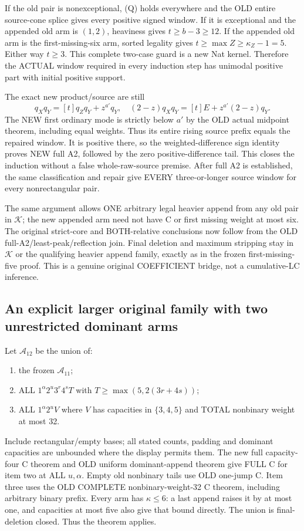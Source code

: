 If the old pair is nonexceptional, (Q) holds everywhere and the
OLD entire source-cone splice gives every positive signed window.
If it is exceptional and the appended old arm is $(1,2)$,
heaviness gives $t\ge b-3\ge12$. If the appended old arm is
the first-missing-six arm, sorted legality gives
$t\ge\max Z\ge\kappa_Z-1=5$. Either way $t\ge3$.
This complete two-case guard is a new Nat kernel.
Therefore the ACTUAL window required in every induction step
has unimodal positive part with initial positive support.

The exact new product/source are still
\[
 q_Xq_Y=[t]q_Zq_Y+z^{a'}q_Y,\quad
 (2-z)q_Xq_Y=[t]E+z^{a'}(2-z)q_Y.
\]
The NEW first ordinary mode is strictly below $a'$ by the OLD
actual midpoint theorem, including equal weights. Thus its
entire rising source prefix equals the repaired window. It is
positive there, so the weighted-difference sign identity proves
NEW full A2, followed by the zero positive-difference tail.
This closes the induction without a false whole-raw-source premise.
After full A2 is established, the same classification and repair
give EVERY three-or-longer source window for every nonrectangular pair.

The same argument allows ONE arbitrary legal heavier append
from any old pair in $\mathcal K$; the new appended arm need
not have C or first missing weight at most six. The original
strict-core and BOTH-relative conclusions now follow from the
OLD full-A2/least-peak/reflection join. Final deletion and
maximum stripping stay in $\mathcal K$ or the qualifying heavier
append family, exactly as in the frozen first-missing-five proof.
This is a genuine original COEFFICIENT bridge, not a cumulative-LC inference.

\subsection{An explicit larger original family with two unrestricted dominant arms}
Let $\mathcal A_{12}$ be the union of:
\begin{enumerate}
\item the frozen $\mathcal A_{11}$;
\item ALL $1^\alpha2^u3^r4^sT$ with
      $T\ge\max(5,2(3r+4s))$;
\item ALL $1^\alpha2^uV$ where $V$ has capacities in $\{3,4,5\}$
      and TOTAL nonbinary weight at most 32.
\end{enumerate}
Include rectangular/empty bases; all stated counts, padding and
dominant capacities are unbounded where the display permits them.
The new full capacity-four C theorem and OLD uniform dominant-append
theorem give FULL C for item two at ALL $u,\alpha$. Empty old
nonbinary tails use OLD one-jump C. Item three uses the OLD COMPLETE
nonbinary-weight-32 C theorem, including arbitrary binary prefix.
Every arm has $\kappa\le6$: a last append raises it by at most one,
and capacities at most five also give that bound directly.
The union is final-deletion closed. Thus the theorem applies.

